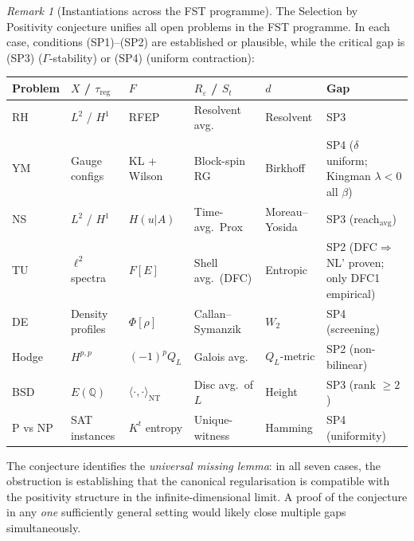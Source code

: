\documentclass[12pt,a4paper]{article}
\theoremstyle{definition}
\theoremstyle{remark}
\newtheorem{remark}[theorem]{Remark}
\begin{document}
\begin{remark}[Instantiations across the FST programme]
\label{rem:selection-instantiations}
The Selection by Positivity conjecture unifies all open problems in the FST programme. In each case, conditions \textup{(SP1)--(SP2)} are established or plausible, while the critical gap is \textup{(SP3)} ($\Gamma$-stability) or \textup{(SP4)} (uniform contraction):

\begin{center}
\small
\begin{tabular}{l|l|l|l|l|l}
\textbf{Problem} & $X$ / $\tau_{\mathrm{reg}}$ & $F$ & $R_\varepsilon$ / $S_t$ & $d$ & \textbf{Gap} \\
\hline
RH & $L^2$ / $H^1$ & RFEP & Resolvent avg. & Resolvent & SP3 \\
YM & Gauge configs & KL + Wilson & Block-spin RG & Birkhoff & SP4 ($\delta$ uniform; Kingman $\lambda < 0$ all $\beta$) \\
NS & $L^2$ / $H^1$ & $H(u|A)$ & Time-avg.\ Prox & Moreau--Yosida & SP3 (reach$_{\mathrm{avg}}$) \\
TU & $\ell^2$ spectra & $F[E]$ & Shell avg.\ (DFC) & Entropic & SP2 (DFC$\Rightarrow$NL' proven; only DFC1 empirical) \\
DE & Density profiles & $\Phi[\rho]$ & Callan--Symanzik & $W_2$ & SP4 (screening) \\
Hodge & $H^{p,p}$ & $(-1)^p Q_L$ & Galois avg. & $Q_L$-metric & SP2 (non-bilinear) \\
BSD & $E(\mathbb{Q})$ & $\langle\cdot,\cdot\rangle_{\mathrm{NT}}$ & Disc avg.\ of $L$ & Height & SP3 (rank $\geq 2$) \\
P vs NP & SAT instances & $K^t$ entropy & Unique-witness & Hamming & SP4 (uniformity) \\
\end{tabular}
\end{center}

\noindent
The conjecture identifies the \emph{universal missing lemma}: in all seven cases, the obstruction is establishing that the canonical regularisation is compatible with the positivity structure in the infinite-dimensional limit. A proof of the conjecture in any \emph{one} sufficiently general setting would likely close multiple gaps simultaneously.
\end{remark}
\end{document}
